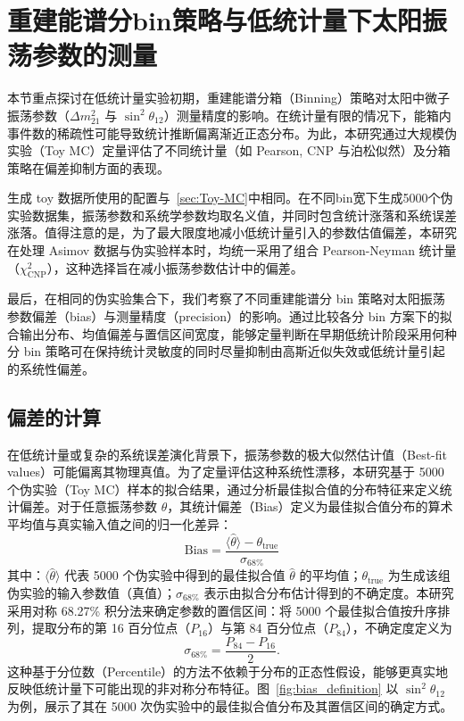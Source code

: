 \section{重建能谱分bin策略与低统计量下太阳振荡参数的测量}
\label{sec:recon_binning}

本节重点探讨在低统计量实验初期，重建能谱分箱（Binning）策略对太阳中微子振荡参数（$\Delta m^2_{21}$ 与 $\sin^2\theta_{12}$）测量精度的影响。在统计量有限的情况下，能箱内事件数的稀疏性可能导致统计推断偏离渐近正态分布。为此，本研究通过大规模伪实验（Toy MC）定量评估了不同统计量（如 Pearson, CNP 与泊松似然）及分箱策略在偏差抑制方面的表现。

生成 toy 数据所使用的配置与~\ref{sec:Toy-MC}中相同。在不同bin宽下生成5000个伪实验数据集，振荡参数和系统学参数均取名义值，并同时包含统计涨落和系统误差涨落。值得注意的是，为了最大限度地减小低统计量引入的参数估值偏差，本研究在处理 Asimov 数据与伪实验样本时，均统一采用了组合 Pearson-Neyman 统计量（$\chi^2_{\mathrm{CNP}}$），这种选择旨在减小振荡参数估计中的偏差。

最后，在相同的伪实验集合下，我们考察了不同重建能谱分 bin 策略对太阳振荡参数偏差（bias）与测量精度（precision）的影响。通过比较各分 bin 方案下的拟合输出分布、均值偏差与置信区间宽度，能够定量判断在早期低统计阶段采用何种分 bin 策略可在保持统计灵敏度的同时尽量抑制由高斯近似失效或低统计量引起的系统性偏差。
\subsection{偏差的计算}

在低统计量或复杂的系统误差演化背景下，振荡参数的极大似然估计值（Best-fit values）可能偏离其物理真值。为了定量评估这种系统性漂移，本研究基于 5000 个伪实验（Toy MC）样本的拟合结果，通过分析最佳拟合值的分布特征来定义统计偏差。对于任意振荡参数 $\theta$，其统计偏差（Bias）定义为最佳拟合值分布的算术平均值与真实输入值之间的归一化差异：
\begin{equation}
  \label{eq:bias_def}
  \text{Bias} = \frac{\langle\hat{\theta}\rangle - \theta_{\text{true}}}{\sigma_{\text{68\%}}}
\end{equation}
其中：$\langle\hat{\theta}\rangle$ 代表 5000 个伪实验中得到的最佳拟合值 $\hat{\theta}$ 的平均值；$\theta_{\text{true}}$ 为生成该组伪实验的输入参数值（真值）；$\sigma_{\text{68\%}}$ 表示由拟合分布估计得到的不确定度。本研究采用对称 68.27\% 积分法来确定参数的置信区间：将 5000 个最佳拟合值按升序排列，提取分布的第 16 百分位点（$P_{16}$）与第 84 百分位点（$P_{84}$），不确定度定义为
\begin{equation}
  \label{eq:sigma68}
  \sigma_{\text{68\%}} = \frac{P_{84} - P_{16}}{2}.
\end{equation}
这种基于分位数（Percentile）的方法不依赖于分布的正态性假设，能够更真实地反映低统计量下可能出现的非对称分布特征。图~\ref{fig:bias_definition} 以 $\sin^2\theta_{12}$ 为例，展示了其在 5000 次伪实验中的最佳拟合值分布及其置信区间的确定方式。

